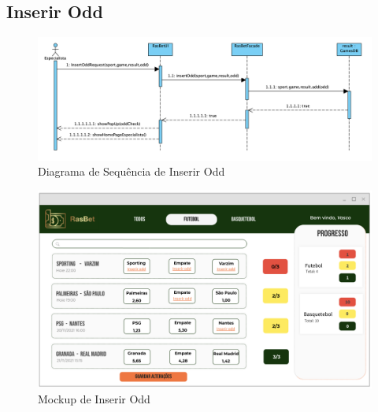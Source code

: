 \subsection{Inserir Odd}
\begin{figure}[H]
\centering
\includegraphics[width=1\textwidth]{imagens/ambitoProduto/SInserirOdd.png}
\caption{Diagrama de Sequência de Inserir Odd}
\end{figure}
\begin{figure}[H]
\centering
\includegraphics[width=1\textwidth]{imagens/ambitoProduto/Mockups/M_InserirODD.png}
\caption{Mockup de Inserir Odd}
\end{figure}

